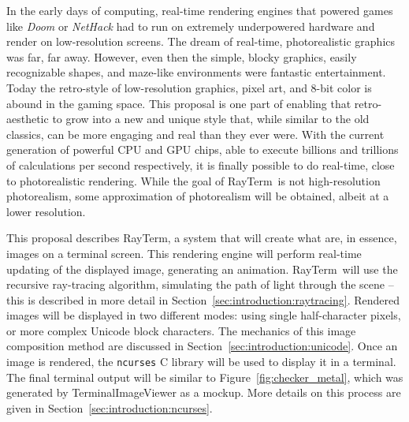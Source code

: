 \documentclass[11pt]{article}
\newcommand{\name}{{\sc RayTerm}}
\begin{document}

In the early days of computing, real-time rendering engines that powered games like {\it Doom} or {\it NetHack} had to run on extremely underpowered hardware and render on low-resolution screens.
The dream of real-time, photorealistic graphics was far, far away.
However, even then the simple, blocky graphics, easily recognizable shapes, and maze-like environments were fantastic entertainment.
Today the retro-style of low-resolution graphics, pixel art, and 8-bit color is abound in the gaming space.
This proposal is one part of enabling that retro-aesthetic to grow into a new and unique style that, while similar to the old classics, can be more engaging and real than they ever were.
With the current generation of powerful CPU and GPU chips, able to execute billions and trillions of calculations per second respectively, it is finally possible to do real-time, close to photorealistic rendering.
While the goal of \name\ is not high-resolution photorealism, some approximation of photorealism will be obtained, albeit at a lower resolution.


This proposal describes \name, a system that will create what are, in essence, images on a terminal screen.
This rendering engine will perform real-time updating of the displayed image, generating an animation.
\name\ will use the recursive ray-tracing algorithm, simulating the path of light through the scene -- this is described in more detail in Section~\ref{sec:introduction:raytracing}.
Rendered images will be displayed in two different modes: using single half-character pixels, or more complex Unicode block characters.
The mechanics of this image composition method are discussed in Section~\ref{sec:introduction:unicode}.
Once an image is rendered, the \texttt{ncurses} C library \cite{ncursesLibrary} will be used to display it in a terminal.
The final terminal output will be similar to Figure~\ref{fig:checker_metal}, which was generated by TerminalImageViewer \cite{tivGithub} as a mockup.
More details on this process are given in Section~\ref{sec:introduction:ncurses}.
\end{document}
